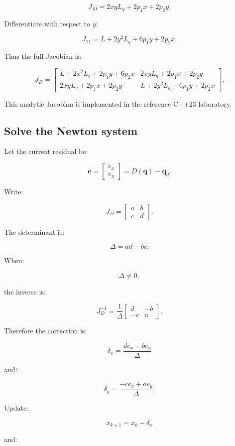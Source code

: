 \[
 \boxed{ J_{10}= 2xyL_q+2p_1x+2p_2y }.
\]

Differentiate with respect to \(y\):

\[
 \boxed{ J_{11}= L+2y^2L_q+6p_1y+2p_2x }.
\]

Thus the full Jacobian is:

\[
 \boxed{ J_D= \begin{bmatrix} L+2x^2L_q+2p_1y+6p_2x& 2xyL_q+2p_1x+2p_2y\\ 2xyL_q+2p_1x+2p_2y& L+2y^2L_q+6p_1y+2p_2x \end{bmatrix} }.
\]

This analytic Jacobian is implemented in the reference C++23 laboratory.

\subsection{Solve the Newton system}\label{02-foundations-ii-ch035-solve-the-newton-system}

Let the current residual be:

\[
 \mathbf e= \begin{bmatrix} e_x\\e_y \end{bmatrix} = D(\mathbf q)-\mathbf q_d.
\]

Write:

\[
 J_D= \begin{bmatrix} a&b\\c&d \end{bmatrix}.
\]

The determinant is:

\[
 \boxed{ \Delta=ad-bc }.
\]

When:

\[
 \Delta\ne0,
\]

the inverse is:

\[
 J_D^{-1} = \frac1\Delta \begin{bmatrix} d&-b\\ -c&a \end{bmatrix}.
\]

Therefore the correction is:

\[
 \boxed{ \delta_x= \frac{de_x-be_y}{\Delta} }
\]

and:

\[
 \boxed{ \delta_y= \frac{-ce_x+ae_y}{\Delta} }.
\]

Update:

\[
 \boxed{ x_{k+1}=x_k-\delta_x }
\]

and:

